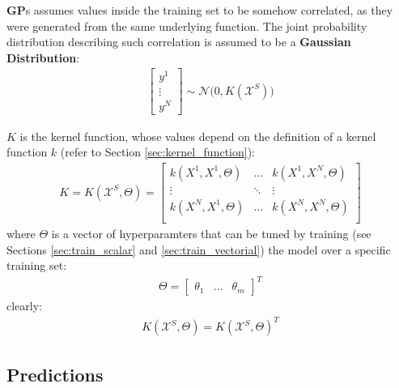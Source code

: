 \documentclass{article}
\begin{document}
\textbf{GP}s assumes values inside the training set to be somehow correlated, as they were generated from the same underlying function.
The joint probability distribution describing such correlation is assumed to be a \textbf{Gaussian Distribution}:
\begin{eqnarray}
\begin{bmatrix} y^1 \\ \vdots \\ y^N \end{bmatrix} \sim \mathcal{N} 
\bigg (
0, K(\mathcal{X}^S)
\bigg ) 
\label{eq:y_joint_distr}
\end{eqnarray}

$K$ is the kernel function, whose values depend on the definition of a kernel function $k$ (refer to Section \ref{sec:kernel_function}):
\begin{eqnarray}
K = K(\mathcal{X}^S, \Theta) = \begin{bmatrix}
k(X^1, X^1, \Theta) & \hdots & k(X^1, X^N, \Theta) \\ 
\vdots & \ddots & \vdots \\ 
k(X^N, X^1, \Theta) & \hdots & k(X^N, X^N, \Theta) \\ 
\end{bmatrix}
\end{eqnarray}
where $\Theta$ is a vector of hyperparamters that can be tuned by training (see Sections \ref{sec:train_scalar} and \ref{sec:train_vectorial}) the model over a specific training set:
\begin{eqnarray}
\Theta = \begin{bmatrix} \theta_1 & \hdots & \theta_m \end{bmatrix} ^ T
\end{eqnarray}
clearly:
\begin{eqnarray}
K(\mathcal{X}^S, \Theta) = K(\mathcal{X}^S, \Theta)^T
\end{eqnarray}

\subsection{Predictions}
\label{sec:predictions_scalar}
\end{document}
